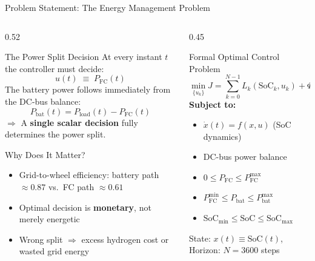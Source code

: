 \documentclass[aspectratio=169, 10pt]{beamer}
\newcommand{\PFC}{P_{\mathrm{FC}}}
\newcommand{\Pbat}{P_{\mathrm{bat}}}
\newcommand{\Pload}{P_{\mathrm{load}}}
\newcommand{\SoC}{\mathrm{SoC}}
\newcommand{\highlight}[1]{\textcolor{fcgold!80!black}{\textbf{#1}}}
\begin{document}
\begin{frame}{Problem Statement: The Energy Management Problem}
  \begin{columns}[T]
    \begin{column}{0.52\textwidth}
      \begin{block}{The Power Split Decision}
        At every instant $t$ the controller must decide:
        \[
          u(t) \;\equiv\; \PFC(t)
        \]
        The battery power follows immediately from the DC-bus balance:
        \[
          \Pbat(t) = \Pload(t) - \PFC(t)
        \]
        $\Rightarrow$ A \highlight{single scalar decision} fully determines the power split.
      \end{block}
      \vspace{4pt}
      \begin{block}{Why Does It Matter?}
        \begin{itemize}
          \item Grid-to-wheel efficiency: battery path $\approx 0.87$ vs.\ FC path $\approx 0.61$
          \item Optimal decision is \highlight{monetary}, not merely energetic
          \item Wrong split $\Rightarrow$ excess hydrogen cost or wasted grid energy
        \end{itemize}
      \end{block}
    \end{column}
    \begin{column}{0.45\textwidth}
      \begin{alertblock}{Formal Optimal Control Problem}
        \[
          \min_{\{u_k\}} J = \sum_{k=0}^{N-1} L_k(\SoC_k, u_k) + \Phi(\SoC_N)
        \]
        \textbf{Subject to:}
        \begin{itemize}
          \item[$\bullet$] $\dot{x}(t) = f(x,u)$ \quad (SoC dynamics)
          \item[$\bullet$] DC-bus power balance
          \item[$\bullet$] $0 \le \PFC \le \PFC^{\max}$
          \item[$\bullet$] $\PFC^{\min} \le \Pbat \le \Pbat^{\max}$
          \item[$\bullet$] $\SoC_{\min} \le \SoC \le \SoC_{\max}$
        \end{itemize}
        \vspace{2pt}
        State: $x(t)\equiv\SoC(t)$, Horizon: $N=3600$ steps
      \end{alertblock}
    \end{column}
  \end{columns}
\end{frame}
\end{document}
